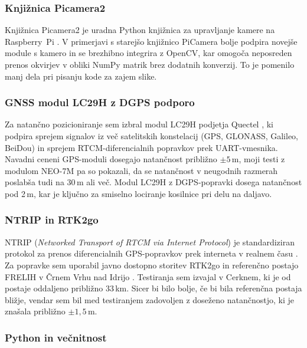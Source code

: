 \documentclass[12pt]{article}
\begin{document}
\subsubsection{Knjižnica Picamera2}
\label{sec:picamera2}

Knjižnica Picamera2 je uradna Python knjižnica za upravljanje kamere na
Raspberry~Pi \parencite{raspi_camera_software}. V primerjavi s starejšo
knjižnico PiCamera bolje podpira novejše module s kamero in se
brezhibno integrira z OpenCV, kar omogoča neposreden prenos okvirjev
v obliki NumPy matrik brez dodatnih konverzij. To je pomenilo manj
dela pri pisanju kode za zajem slike.

\subsubsection{GNSS modul LC29H z DGPS podporo}

Za natančno pozicioniranje sem izbral modul LC29H podjetja Quectel
\parencite{lc29h_datasheet}, ki podpira sprejem signalov iz več
satelitskih konstelacij (GPS, GLONASS, Galileo, BeiDou) in sprejem
RTCM-diferencialnih popravkov prek UART-vmesnika. Navadni ceneni
GPS-moduli dosegajo natančnost približno $\pm 5$\,m, moji testi z
modulom NEO-7M pa so pokazali, da se natančnost v neugodnih razmerah
poslabša tudi na 30\,m ali več. Modul LC29H z DGPS-popravki dosega
natančnost pod 2\,m, kar je ključno za smiselno lociranje kosilnice pri
delu na daljavo.

\subsubsection{NTRIP in RTK2go}

NTRIP (\textit{Networked Transport of RTCM via Internet Protocol}) je
standardiziran protokol za prenos diferencialnih GPS-popravkov prek
interneta v realnem času \parencite{ntrip_protocol}. Za popravke sem
uporabil javno dostopno storitev RTK2go in referenčno postajo FRELIH
v Črnem Vrhu nad Idrijo \parencite{rtk2go}. Testiranja sem izvajal v
Cerknem, ki je od postaje oddaljeno približno 33\,km. Sicer bi bilo
bolje, če bi bila referenčna postaja bližje, vendar sem bil med
testiranjem zadovoljen z doseženo natančnostjo, ki je znašala
približno $\pm 1{,}5$\,m.

\subsubsection{Python in večnitnost}
\end{document}
